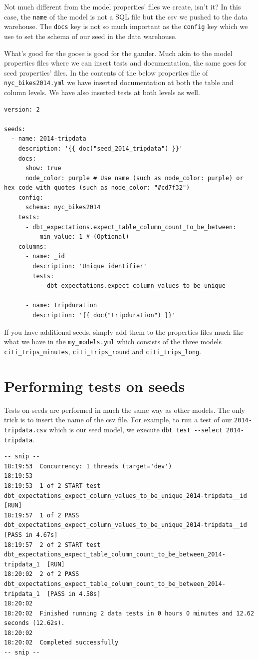 \documentclass[
]{book}
\begin{document}
Not much different from the model properties' files we create, isn't it? In this case, the \texttt{name} of the model is not a SQL file but the csv we pushed to the data warehouse. The \texttt{docs} key is not so much important as the \texttt{config} key which we use to set the schema of our seed in the data warehouse.

What's good for the goose is good for the gander. Much akin to the model properties files where we can insert tests and documentation, the same goes for seed properties' files. In the contents of the below properties file of \texttt{nyc\_bikes2014.yml} we have inserted documentation at both the table and column levels. We have also inserted tests at both levels as well.

\begin{verbatim}
version: 2

seeds:
  - name: 2014-tripdata
    description: '{{ doc("seed_2014_tripdata") }}'
    docs:
      show: true 
      node_color: purple # Use name (such as node_color: purple) or hex code with quotes (such as node_color: "#cd7f32")
    config:
      schema: nyc_bikes2014
    tests:
      - dbt_expectations.expect_table_column_count_to_be_between:
          min_value: 1 # (Optional)
    columns:
      - name: _id
        description: 'Unique identifier'
        tests:
          - dbt_expectations.expect_column_values_to_be_unique

      - name: tripduration
        description: '{{ doc("tripduration") }}'
\end{verbatim}

If you have additional seeds, simply add them to the properties files much like what we have in the \texttt{my\_models.yml} which consists of the three models \texttt{citi\_trips\_minutes}, \texttt{citi\_trips\_round} and \texttt{citi\_trips\_long}.

\hypertarget{performing-tests-on-seeds}{%
\section{Performing tests on seeds}\label{performing-tests-on-seeds}}

Tests on seeds are performed in much the same way as other models. The only trick is to insert the name of the csv file. For example, to run a test of our \texttt{2014-tripdata.csv} which is our seed model, we execute \texttt{dbt\ test\ -\/-select\ 2014-tripdata}.

\begin{verbatim}
-- snip --
18:19:53  Concurrency: 1 threads (target='dev')
18:19:53  
18:19:53  1 of 2 START test dbt_expectations_expect_column_values_to_be_unique_2014-tripdata__id  [RUN]
18:19:57  1 of 2 PASS dbt_expectations_expect_column_values_to_be_unique_2014-tripdata__id  [PASS in 4.67s]
18:19:57  2 of 2 START test dbt_expectations_expect_table_column_count_to_be_between_2014-tripdata_1  [RUN]
18:20:02  2 of 2 PASS dbt_expectations_expect_table_column_count_to_be_between_2014-tripdata_1  [PASS in 4.58s]
18:20:02  
18:20:02  Finished running 2 data tests in 0 hours 0 minutes and 12.62 seconds (12.62s).
18:20:02  
18:20:02  Completed successfully
-- snip --
\end{verbatim}
\end{document}
